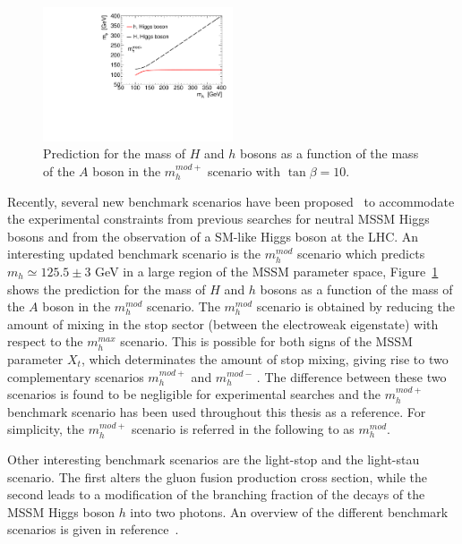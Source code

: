 \begin{figure}[tp]
     \begin{center}

            \includegraphics[width=0.5\textwidth]{figure/mass.pdf}
    \end{center}
    \caption{ Prediction for the mass of $H$ and $h$ bosons as a function
of the mass of the $A$ boson in the $m_h^{mod+}$ scenario with $\tan\beta=10$. }

   \label{fig:higgsmass}
\end{figure}


 

Recently, several new benchmark scenarios have been proposed~\cite{LHCxsec} to  
accommodate the experimental constraints from previous searches for neutral MSSM Higgs bosons and from the observation of a SM-like Higgs boson
at the LHC. An interesting updated benchmark scenario is the $m_h^{mod}$ scenario which predicts $m_h \simeq 125.5 \pm 3 $ GeV 
in  a large region of the MSSM parameter space, Figure~\ref{fig:higgsmass} shows the prediction for the mass of $H$ and $h$ bosons as a function
of the mass of the $A$ boson in the $m_h^{mod}$ scenario.  
The  $m_h^{mod}$ scenario is obtained by reducing the amount 
of mixing in the stop sector (between the electroweak eigenstate) with respect to  the  $m_h^{max}$ scenario. 
This is possible for both signs of the MSSM parameter $X_t$, which determinates the amount of  
stop mixing, giving rise to two complementary scenarios $m_h^{mod+}$ and $m_h^{mod-}\,.$
The difference between these two scenarios is found to be negligible for experimental searches and
the  $m_h^{mod+}$ benchmark scenario has been used throughout this thesis as a reference. For simplicity, the $m_h^{mod+}$ scenario is referred 
in the following to as $m_h^{mod}$.

Other interesting benchmark scenarios are the light-stop and the light-stau scenario.
The first alters  the gluon fusion production cross section, while the second leads
to a modification of the branching fraction of the decays of the MSSM Higgs boson $h$ into two photons.
An overview of the different  benchmark scenarios is given in reference~\cite{LHCxsec}. 




